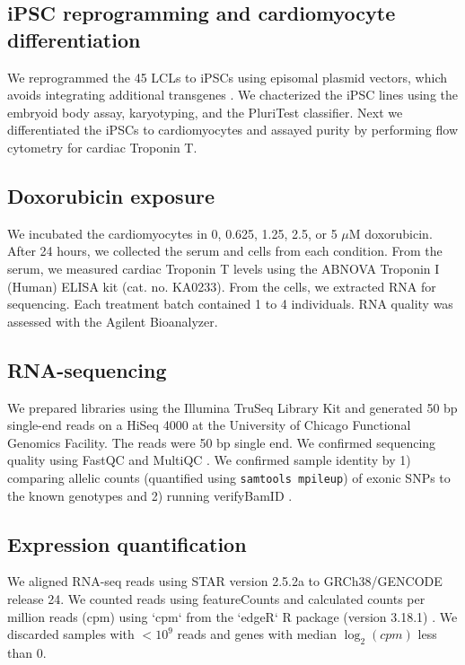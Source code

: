 \documentclass{article}
\begin{document}
\subsection*{iPSC reprogramming and cardiomyocyte differentiation} 

We reprogrammed the 45 LCLs to iPSCs using episomal plasmid vectors,
which avoids integrating additional transgenes \cite{Okita2011}. We
chacterized the iPSC lines using the embryoid body assay, karyotyping,
and the PluriTest \cite{Muller2011} classifier. Next we differentiated
the iPSCs to cardiomyocytes \cite{Lian2013, Burridge2014} and assayed
purity by performing flow cytometry for cardiac Troponin T.

\subsection*{Doxorubicin exposure}

We incubated the cardiomyocytes in 0, 0.625, 1.25, 2.5, or 5 $\mu$M
doxorubicin. After 24 hours, we collected the serum and cells from each
condition. From the serum, we measured cardiac Troponin T levels using the
ABNOVA Troponin I (Human) ELISA kit (cat. no. KA0233). From the cells, we
extracted RNA for sequencing. Each treatment batch contained 1 to 4
individuals. RNA quality was assessed with the Agilent Bioanalyzer.

\subsection*{RNA-sequencing}

We prepared libraries using the Illumina TruSeq Library Kit and
generated 50 bp single-end reads on a HiSeq 4000 at the University of
Chicago Functional Genomics Facility. The reads were 50 bp single
end. We confirmed sequencing quality using FastQC and MultiQC
\cite{Ewels2016}. We confirmed sample identity by 1) comparing
allelic counts (quantified using \texttt{samtools mpileup}) of exonic SNPs to the known genotypes and 2) running
verifyBamID \cite{Jun2012}.

\subsection*{Expression quantification}

We aligned RNA-seq reads using STAR version 2.5.2a \cite{Dobin2013} to GRCh38/GENCODE release 24. We counted reads using featureCounts \cite{Liao2014} and calculated counts per million reads (cpm) using `cpm` from the `edgeR` R package (version 3.18.1) \cite{Robinson2010}. We discarded samples with $<10^9$ reads and genes with median $\log_2(cpm)$ less than $0$.
\end{document}
